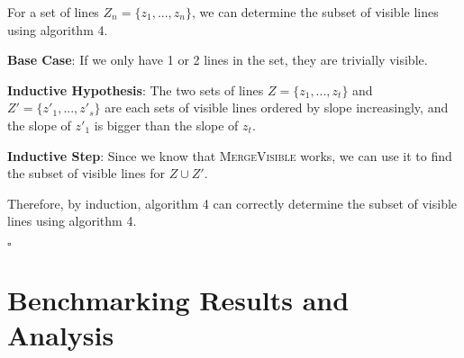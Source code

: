 \documentclass[12pt,letterpaper]{article}
\begin{document}
For a set of lines $Z_n = \{ z_1, ..., z_n \}$, we can determine the subset of visible lines using algorithm 4.

\textbf{Base Case}: If we only have 1 or 2 lines in the set, they are trivially visible.

\textbf{Inductive Hypothesis}: The two sets of lines $Z = \{ z_1, ..., z_t \}$ and $ Z' = \{ z'_1, ..., z'_s \}$ are each sets of visible lines ordered by slope increasingly, and the slope of $z'_1$ is bigger than the slope of $z_t$.

\textbf{Inductive Step}: Since we know that \textsc{MergeVisible} works, we can use it to find the subset of visible lines for $Z \cup Z'$.

Therefore, by induction, algorithm 4 can correctly determine the subset of visible lines using algorithm 4.

$\square$

\section{Benchmarking Results and Analysis}
\end{document}
